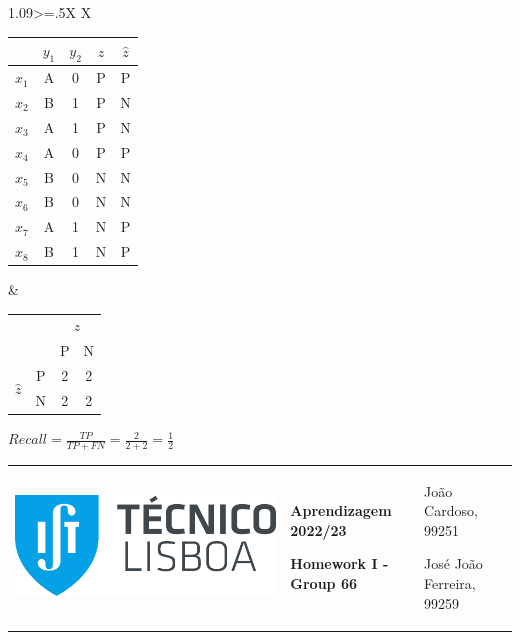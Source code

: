 \documentclass[11pt,a4paper]{article}
\begin{document}
\begin{flushleft}
  \vspace{5mm}
  \begin{tabularx}{1.09\textwidth}{>{\hsize=.5\hsize}X X}
    \begin{tabular}{c|cc|c|c}
            & $y_1$ & $y_2$ & $z$ & $\hat{z}$ \\ \hline
      $x_1$ & A     & 0     & P   & P         \\
      $x_2$ & B     & 1     & P   & N         \\
      $x_3$ & A     & 1     & P   & N         \\
      $x_4$ & A     & 0     & P   & P         \\ \hline
      $x_5$ & B     & 0     & N   & N         \\
      $x_6$ & B     & 0     & N   & N         \\
      $x_7$ & A     & 1     & N   & P         \\
      $x_8$ & B     & 1     & N   & P        
    \end{tabular}
    &
    \vspace{10mm}\begin{tabular}{llcc}
                                                                 &                        & \multicolumn{2}{c}{$z$} \\
                                                                 & \multicolumn{1}{l|}{}  & \multicolumn{1}{c|}{P}   & N   \\ \cline{2-4} 
    \multicolumn{1}{c}{\multirow{2}{*}{$\hat{z}$}} & \multicolumn{1}{c|}{P} & \multicolumn{1}{c|}{2}   & 2   \\ \cline{2-4} 
    \multicolumn{1}{c}{}                                         & \multicolumn{1}{c|}{N} & \multicolumn{1}{c|}{2}   & 2
    \end{tabular} \par
    \vspace{5mm} $ Recall = \frac{TP}{TP + FN} = \frac{2}{2 + 2} = \frac{1}{2} $
  \end{tabularx}
\end{flushleft}
\normalsize

\pagebreak
\color{darkgray}
\hspace{-8.25mm}
\begin{tabularx}{1.09\textwidth} {>{\raggedright\arraybackslash}X >{\centering\arraybackslash}X >{\raggedleft\arraybackslash}X}
  \includegraphics[scale=0.2]{tecnico.pdf} &
  \textbf{Aprendizagem 2022/23} \par \textbf{Homework I - Group 66} &
  João Cardoso, 99251 \par José João Ferreira, 99259
\end{tabularx}
\color{black}
\end{document}

